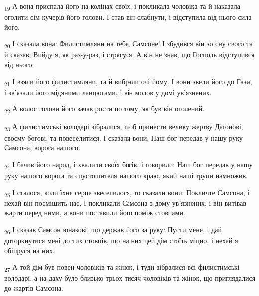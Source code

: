 \begin{tcolorbox}
\textsubscript{19} А вона приспала його на колінах своїх, і покликала чоловіка та й наказала оголити сім кучерів його голови. І став він слабнути, і відступила від нього сила його.
\end{tcolorbox}
\begin{tcolorbox}
\textsubscript{20} І сказала вона: Филистимляни на тебе, Самсоне! І збудився він зо сну свого та й сказав: Вийду я, як раз-у-раз, і стрясуся. А він не знав, що Господь відступився від нього.
\end{tcolorbox}
\begin{tcolorbox}
\textsubscript{21} І взяли його филистимляни, та й вибрали очі йому. І вони звели його до Гази, і зв'язали його мідяними ланцюгами, і він молов у домі ув'язнених.
\end{tcolorbox}
\begin{tcolorbox}
\textsubscript{22} А волос голови його зачав рости по тому, як був він оголений.
\end{tcolorbox}
\begin{tcolorbox}
\textsubscript{23} А филистимські володарі зібралися, щоб принести велику жертву Даґонові, своєму богові, та повеселитися. І сказали вони: Наш бог передав у нашу руку Самсона, ворога нашого.
\end{tcolorbox}
\begin{tcolorbox}
\textsubscript{24} І бачив його народ, і хвалили своїх богів, і говорили: Наш бог передав у нашу руку нашого ворога та спустошителя нашого краю, який наші трупи намножив.
\end{tcolorbox}
\begin{tcolorbox}
\textsubscript{25} І сталося, коли їхнє серце звеселилося, то сказали вони: Покличте Самсона, і нехай він посмішить нас. І покликали Самсона з дому ув'язнених, і він витівав жарти перед ними, а вони поставили його поміж стовпами.
\end{tcolorbox}
\begin{tcolorbox}
\textsubscript{26} І сказав Самсон юнакові, що держав його за руку: Пусти мене, і дай доторкнутися мені до тих стовпів, що на них цей дім стоїть міцно, і нехай я обіпруся на них.
\end{tcolorbox}
\begin{tcolorbox}
\textsubscript{27} А той дім був повен чоловіків та жінок, і туди зібралися всі филистимські володарі, а на даху було близько трьох тисяч чоловіків та жінок, що приглядалися до жартів Самсона.
\end{tcolorbox}
